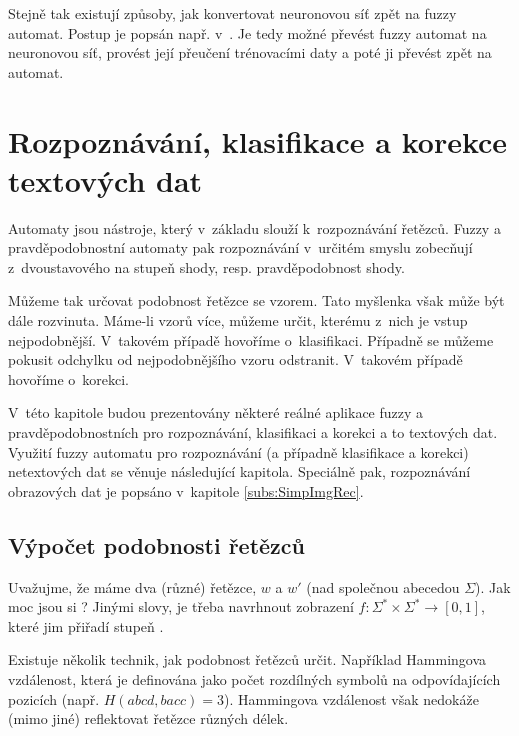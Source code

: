 Stejně tak existují způsoby, jak konvertovat neuronovou síť zpět na fuzzy automat. Postup je popsán např. v~\cite{BlaDelFlo-MethIndFuzzAutUsNeuNet, BlaDelPeg-FuzzGraIntUsiNeuNet}. Je tedy možné převést fuzzy automat na neuronovou síť, provést její přeučení trénovacími daty a poté ji převést zpět na automat.


\section{Rozpoznávání, klasifikace a korekce textových dat} \label{sec:Rec}
Automaty jsou nástroje, který v~základu slouží k~rozpoznávání řetězců. Fuzzy a pravděpodobnostní automaty pak rozpoznávání v~určitém smyslu zobecňují z~dvoustavového  na stupeň shody, resp. pravděpodobnost shody. 

Můžeme tak určovat podobnost řetězce se vzorem. Tato myšlenka však může být dále rozvinuta. Máme-li vzorů více, můžeme určit, kterému z~nich je vstup nejpodobnější. V~takovém případě hovoříme o~klasifikaci. Případně se můžeme pokusit odchylku od nejpodobnějšího vzoru odstranit. V~takovém případě hovoříme o~korekci.

V~této kapitole budou prezentovány některé reálné aplikace fuzzy a pravděpodobnostních pro rozpoznávání, klasifikaci a korekci a to textových dat. Využití fuzzy automatu pro rozpoznávání (a případně klasifikace a korekci) netextových dat se věnuje následující kapitola. Speciálně pak, rozpoznávání obrazových dat je popsáno v~kapitole \ref{subs:SimpImgRec}.

\subsection{Výpočet podobnosti řetězců}
Uvažujme, že máme dva (různé) řetězce, $w$ a $w'$ (nad společnou abecedou $\Sigma$). Jak moc jsou si ? Jinými slovy, je třeba navrhnout zobrazení $f: \Sigma^* \times \Sigma^* \rightarrow [0,1]$, které jim přiřadí stupeň .

Existuje několik technik, jak podobnost řetězců určit. Například Hammingova vzdálenost, která je definována jako počet rozdílných symbolů na odpovídajících pozicích (např. $H(abcd, bacc) = 3$). Hammingova vzdálenost však nedokáže (mimo jiné) reflektovat řetězce různých délek.

